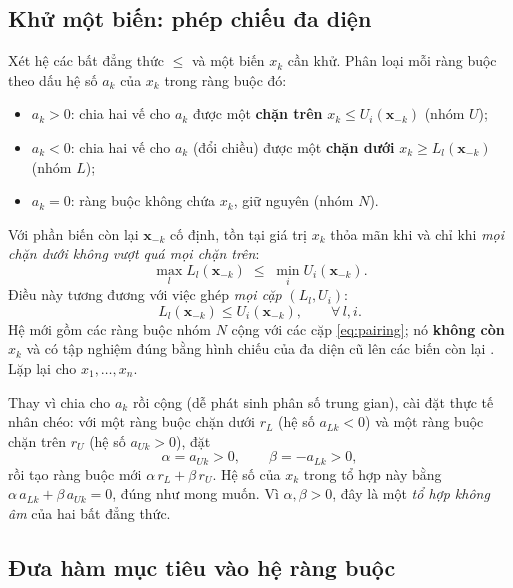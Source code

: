 \documentclass[12pt,a4paper]{article}
\theoremstyle{definition}
\newcommand{\vx}{\mathbf{x}}
\begin{document}
\subsection{Khử một biến: phép chiếu đa diện}

Xét hệ các bất đẳng thức $\le$ và một biến $x_k$ cần khử. Phân loại mỗi ràng
buộc theo dấu hệ số $a_{k}$ của $x_k$ trong ràng buộc đó:
\begin{itemize}
    \item $a_{k} > 0$: chia hai vế cho $a_{k}$ được một \textbf{chặn trên}
          $x_k \le U_i(\vx_{-k})$ (nhóm $U$);
    \item $a_{k} < 0$: chia hai vế cho $a_{k}$ (đổi chiều) được một
          \textbf{chặn dưới} $x_k \ge L_l(\vx_{-k})$ (nhóm $L$);
    \item $a_{k} = 0$: ràng buộc không chứa $x_k$, giữ nguyên (nhóm $N$).
\end{itemize}
Với phần biến còn lại $\vx_{-k}$ cố định, tồn tại giá trị $x_k$ thỏa mãn khi và
chỉ khi \emph{mọi chặn dưới không vượt quá mọi chặn trên}:
\begin{equation}
    \max_l L_l(\vx_{-k}) \;\le\; \min_i U_i(\vx_{-k}).
\end{equation}
Điều này tương đương với việc ghép \emph{mọi cặp} $(L_l, U_i)$:
\begin{equation}
    L_l(\vx_{-k}) \le U_i(\vx_{-k}),
    \qquad \forall\, l, i.
    \label{eq:pairing}
\end{equation}
Hệ mới gồm các ràng buộc nhóm $N$ cộng với các cặp \eqref{eq:pairing}; nó
\textbf{không còn $x_k$} và có tập nghiệm đúng bằng hình chiếu của đa diện cũ
lên các biến còn lại \cite{bertsimas1997, schrijver1986}. Lặp lại cho
$x_1, \ldots, x_n$.

\begin{infobox}
Thay vì chia cho $a_k$ rồi cộng (dễ phát sinh phân số trung gian), cài đặt thực
tế nhân chéo: với một ràng buộc chặn dưới $r_L$ (hệ số $a_{Lk} < 0$) và một
ràng buộc chặn trên $r_U$ (hệ số $a_{Uk} > 0$), đặt
\[
    \alpha = a_{Uk} > 0, \qquad \beta = -a_{Lk} > 0,
\]
rồi tạo ràng buộc mới $\alpha\, r_L + \beta\, r_U$. Hệ số của $x_k$ trong tổ
hợp này bằng $\alpha\,a_{Lk} + \beta\,a_{Uk} = 0$, đúng như mong muốn. Vì
$\alpha, \beta > 0$, đây là một \emph{tổ hợp không âm} của hai bất đẳng thức.
\end{infobox}

\subsection{Đưa hàm mục tiêu vào hệ ràng buộc}
\end{document}
